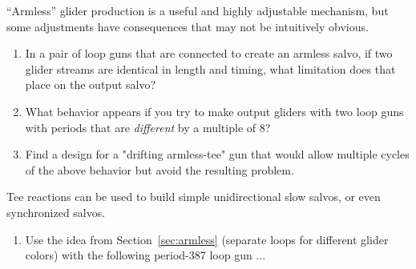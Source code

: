 \begin{multicols}{2}
\begin{problem}
\end{problem}


\mfilbreak


\begin{problem}\label{exer:armless_basics}
	``Armless'' glider production is a useful and highly adjustable mechanism, but some adjustments have consequences that may not be intuitively obvious.
	\begin{enumerate}[label=\bf\color{ocre}(\alph*)]
		\item In a pair of loop guns that are connected to create an armless salvo, if two glider streams are identical in length and timing, what limitation does that place on the output salvo?
		\item What behavior appears if you try to make output gliders with two loop guns with periods that are \emph{different} by a multiple of 8?
		\item Find a design for a "drifting armless-tee" gun that would allow multiple cycles of the above behavior but avoid the resulting problem.
	\end{enumerate}
\end{problem}


\mfilbreak


\begin{problem}\label{exer:armless_tee}
	Tee reactions can be used to build simple unidirectional slow salvos, or even synchronized salvos.
	\begin{enumerate}[label=\bf\color{ocre}(\alph*)]
		\item Use the idea from Section~\ref{sec:armless} (separate loops for different glider colors) with the following period-387 loop gun ...
    	
    	\begin{center}
    	\end{center}
    

\end{enumerate}
\end{problem}
\end{multicols}
